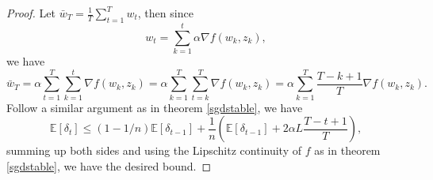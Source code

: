 \documentclass{article}[12pt]
\def\E{\mathbb{E}}
\def \E{\mathbb{E}}
\begin{document}
\begin{proof}
 Let $\bar{w}_T = \frac{1}{T} \sum_{t=1}^T w_t$, then since 
  \[
  w_t = \sum_{k = 1}^{t} \alpha \nabla f(w_k, z_k),    
  \]  we have 
  \[
  \bar{w}_T = \alpha \sum_{t=1}^T \sum_{k=1}^t \nabla f(w_k, z_k) = \alpha \sum_{k=1}^T \sum_{t=k}^T \nabla f(w_k, z_k) = \alpha \sum_{k=1}^T \frac{T-k+1}{T} \nabla f(w_k, z_k).
  \] Follow a similar argument as in theorem \ref{sgdstable}, we have 
  \[
  \E[\delta_t] \leq (1-1/n) \E [\delta_{t-1}] + \frac{1}{n} \left( \E[\delta_{t-1}] + 2\alpha L \frac{T-t+1}{T} \right),  
  \] summing up both sides and using the Lipschitz continuity of $f$ as in theorem \ref{sgdstable}, we have the desired bound. 
\end{proof}

% 


%
 
\end{document}
